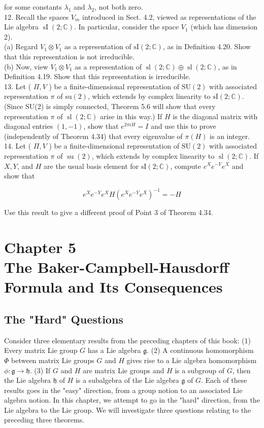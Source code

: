 \documentclass[10pt, letterpaper]{article}
\begin{document}
for some constants $\lambda_{1}$ and $\lambda_{2}$, not both zero.\\
12. Recall the spaces $V_{m}$ introduced in Sect. 4.2, viewed as representations of the Lie algebra $\operatorname{sI}(2 ; \mathbb{C})$. In particular, consider the space $V_{1}$ (which has dimension 2).\\
(a) Regard $V_{1} \otimes V_{1}$ as a representation of $\mathrm{sI}(2 ; \mathbb{C})$, as in Definition 4.20. Show that this representation is not irreducible.\\
(b) Now, view $V_{1} \otimes V_{1}$ as a representation of $\operatorname{sl}(2 ; \mathbb{C}) \oplus \operatorname{sl}(2 ; \mathbb{C})$, as in Definition 4.19. Show that this representation is irreducible.\\
13. Let ( $\Pi, V$ ) be a finite-dimensional representation of $\mathrm{SU}(2)$ with associated representation $\pi$ of $\mathrm{su}(2)$, which extends by complex linearity to $\mathrm{sI}(2 ; \mathbb{C})$. (Since SU(2) is simply connected, Theorem 5.6 will show that every representation $\pi$ of $\operatorname{sl}(2 ; \mathbb{C})$ arise in this way.) If $H$ is the diagonal matrix with diagonal entries $(1,-1)$, show that $e^{2 \pi i H}=I$ and use this to prove (independently of Theorem 4.34) that every eigenvalue of $\pi(H)$ is an integer.\\
14. Let ( $\Pi, V$ ) be a finite-dimensional representation of $\mathrm{SU}(2)$ with associated representation $\pi$ of $\operatorname{su}(2)$, which extends by complex linearity to $\operatorname{sl}(2 ; \mathbb{C})$. If $X, Y$, and $H$ are the usual basis element for $\mathrm{sI}(2 ; \mathbb{C})$, compute $e^{X} e^{-Y} e^{X}$ and show that

$$
e^{X} e^{-Y} e^{X} H\left(e^{X} e^{-Y} e^{X}\right)^{-1}=-H
$$

Use this result to give a different proof of Point 3 of Theorem 4.34.

\section*{Chapter 5 \\
 The Baker-Campbell-Hausdorff Formula and Its Consequences}
\subsection*{The "Hard" Questions}
Consider three elementary results from the preceding chapters of this book: (1) Every matrix Lie group $G$ has a Lie algebra $\mathfrak{g}$. (2) A continuous homomorphism $\Phi$ between matrix Lie groups $G$ and $H$ gives rise to a Lie algebra homomorphism $\phi: \mathfrak{g} \rightarrow \mathfrak{h}$. (3) If $G$ and $H$ are matrix Lie groups and $H$ is a subgroup of $G$, then the Lie algebra $\mathfrak{h}$ of $H$ is a subalgebra of the Lie algebra $\mathfrak{g}$ of $G$. Each of these results goes in the "easy" direction, from a group notion to an associated Lie algebra notion. In this chapter, we attempt to go in the "hard" direction, from the Lie algebra to the Lie group. We will investigate three questions relating to the preceding three theorems.
\end{document}
